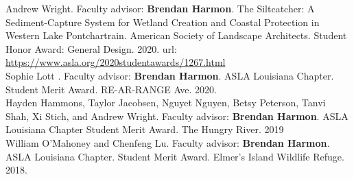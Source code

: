 \documentclass[10pt]{developercv} %
\begin{document}





Andrew Wright. Faculty advisor: \textbf{Brendan Harmon}. The Siltcatcher: A Sediment-Capture System for Wetland Creation and Coastal Protection in Western Lake Pontchartrain. American Society of Landscape Architects. Student Honor Award: General Design. 2020. url: \url{https://www.asla.org/2020studentawards/1267.html}\\

Sophie Lott	. Faculty advisor: \textbf{Brendan Harmon}. ASLA Louisiana Chapter. Student Merit Award. RE-AR-RANGE Ave. 2020.	\\

Hayden Hammons, Taylor Jacobsen, Nguyet Nguyen, Betsy Peterson, Tanvi Shah, Xi Stich, and Andrew Wright. Faculty advisor: \textbf{Brendan Harmon}. ASLA Louisiana Chapter Student Merit Award. The Hungry River. 2019\\

William O'Mahoney and Chenfeng Lu. Faculty advisor: \textbf{Brendan Harmon}. ASLA Louisiana Chapter. Student Merit Award. Elmer’s Island Wildlife Refuge. 2018.\\


\end{document}
